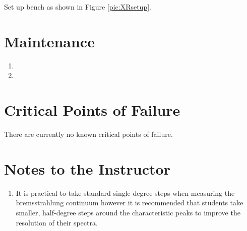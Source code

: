 \documentclass[justified]{tufte-book}
\begin{document}
Set up bench as shown in Figure \ref{pic:XRsetup}.

\section{Maintenance}

\begin{enumerate}
\item 
\item 
\end{enumerate}

\section{Critical Points of Failure}

There are currently no known critical points of failure.

\section{Notes to the Instructor}
\begin{enumerate}
\item It is practical to take standard single-degree steps when measuring the bremsstrahlung continuum however it is recommended that students take smaller, half-degree steps around the characteristic peaks to improve the resolution of their spectra.
\end{enumerate}
\end{document}
